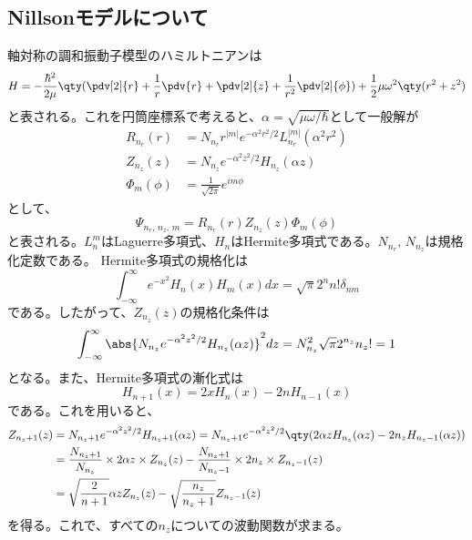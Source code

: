 \documentclass[a4paper,11pt,uplatex]{jsarticle}%
\begin{document}
\subsection{Nillsonモデルについて}
軸対称の調和振動子模型のハミルトニアンは
\begin{equation}
  H = -\frac{\hbar^2}{2\mu}\qty(\pdv[2]{r} + \frac{1}{r}\pdv{r} + \pdv[2]{z} + \frac{1}{r^2}\pdv[2]{\phi}) + \frac{1}{2}\mu\omega^2\qty(r^2 + z^2)
\end{equation}
と表される。これを円筒座標系で考えると、$\alpha = \sqrt{\mu\omega/\hbar}$として一般解が
\begin{align}
  R_{n_r}(r)   & = N_{n_r}r^{|m|}e^{-\alpha^2r^2/2}L_{n_r}^{|m|}(\alpha^2r^2) \\
  Z_{n_z}(z)   & = N_{n_z}e^{-\alpha^2z^2/2}H_{n_z}(\alpha z)                 \\
  \Phi_m(\phi) & = \frac{1}{\sqrt{2\pi}}e^{im\phi}
\end{align}
として、
\begin{equation}
  \Psi_{n_r,\,n_z,\,m} = R_{n_r}(r)Z_{n_z}(z)\Phi_m(\phi)
\end{equation}
と表される。$L_n^m$はLaguerre多項式、$H_n$はHermite多項式である。$N_{n_r},\,N_{n_z}$は規格化定数である。
Hermite多項式の規格化は
\begin{equation}
  \int_{-\infty}^{\infty}e^{-x^2}H_n(x)H_m(x)dx = \sqrt{\pi}2^nn!\delta_{nm}
\end{equation}
である。したがって、$Z_{n_z}(z)$の規格化条件は
\begin{equation}
  \int_{-\infty}^{\infty}\abs{N_{n_z}e^{-\alpha^2z^2/2}H_{n_z}(\alpha z)}^2dz = N_{n_z}^2\sqrt{\pi}2^{n_z}n_z! = 1
\end{equation}
となる。また、Hermite多項式の漸化式は
\begin{equation}
  H_{n+1}(x) = 2xH_n(x) - 2nH_{n-1}(x)
\end{equation}
である。これを用いると、
\begin{align}
  Z_{n_z+1}(z) & = N_{n_z+1}e^{-\alpha^2z^2/2}H_{n_z+1}(\alpha z) = N_{n_z+1}e^{-\alpha^2z^2/2}\qty(2\alpha zH_{n_z}(\alpha z) - 2n_zH_{n_z-1}(\alpha z)) \notag \\
               & = \frac{N_{n_z+1}}{N_{n_z}}\times2\alpha z\times Z_{n_z}(z) - \frac{N_{n_z+1}}{N_{n_z-1}}\times 2 n_{z}\times Z_{n_z-1}(z) \notag               \\
               & = \sqrt{\frac{2}{n+1}}\alpha z Z_{n_z}(z) - \sqrt{\frac{n_z}{n_z+1}}Z_{n_z-1}(z)
\end{align}
を得る。これで、すべての$n_z$についての波動関数が求まる。
\end{document}
